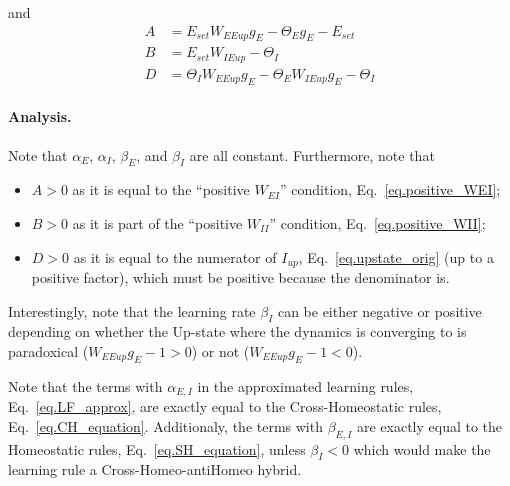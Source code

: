\documentclass[twocolumn]{article}
\newcommand{\EE}{\mathit{EE}}
\newcommand{\EI}{\mathit{EI}}
\newcommand{\IE}{\mathit{IE}}
\newcommand{\II}{\mathit{II}}
\newcommand{\set}{\mathit{set}}
\newcommand{\up}{\mathit{up}}
\begin{document}
\noindent and
\begin{displaymath}
\begin{aligned}
A & = E_{\set} W_{\EE\up} g_E - \Theta_E g_E - E_{\set} \\
B & = E_{\set} W_{\IE\up} - \Theta_I \\
D & = \Theta_I W_{\EE\up} g_E - \Theta_E W_{\IE\up} g_E - \Theta_I
\end{aligned}
\end{displaymath}

\paragraph{Analysis.} Note that $\alpha_E$, $\alpha_I$, $\beta_E$, and $\beta_I$ are all constant. Furthermore, note that
\begin{itemize}
\item $A>0$ as it is equal to the ``positive $W_{\EI}$'' condition, Eq.\ \ref{eq.positive_WEI};
\item $B>0$ as it is part of the ``positive $W_{\II}$'' condition, Eq.\ \ref{eq.positive_WII};
\item $D>0$ as it is equal to the numerator of $I_{\up}$, Eq.\ \ref{eq.upstate_orig} (up to a positive factor), which must be positive because the denominator is.
\end{itemize}

\noindent Interestingly, note that the learning rate $\beta_I$ can be either negative or positive depending on whether the Up-state where the dynamics is converging to is paradoxical ($W_{\EE\up}g_E - 1 > 0$) or not ($W_{\EE\up}g_E - 1 < 0$).


\noindent Note that the terms with $\alpha_{E,I}$ in the approximated learning rules, Eq.\ \ref{eq.LF_approx}, are exactly equal to the Cross-Homeostatic rules, Eq.\ \ref{eq.CH_equation}. Additionaly, the terms with $\beta_{E,I}$ are exactly equal to the Homeostatic rules, Eq.\ \ref{eq.SH_equation}, unless $\beta_I<0$ which would make the learning rule a Cross-Homeo-antiHomeo hybrid.





\printbibliography
\end{document}
